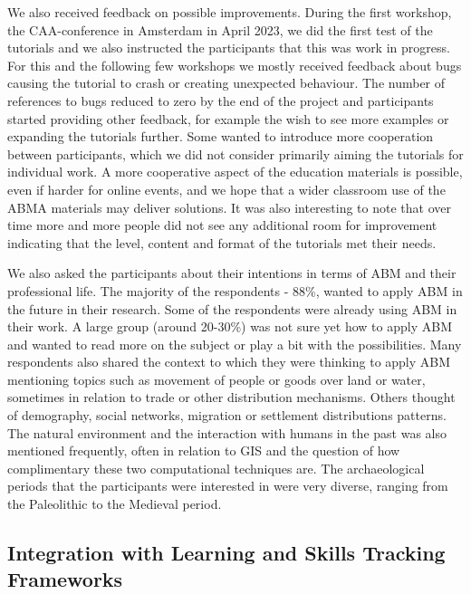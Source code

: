 \documentclass[
]{article}
\begin{document}
We also received feedback on possible improvements. During the first workshop, the CAA-conference in Amsterdam in April 2023, we did the first test of the tutorials and we also instructed the participants that this was work in progress. For this and the following few workshops we mostly received feedback about bugs causing the tutorial to crash or creating unexpected behaviour. The number of references to bugs reduced to zero by the end of the project and participants started providing other feedback, for example the wish to see more examples or expanding the tutorials further. Some wanted to introduce more cooperation between participants, which we did not consider primarily aiming the tutorials for individual work. A more cooperative aspect of the education materials is possible, even if harder for online events, and we hope that a wider classroom use of the ABMA materials may deliver solutions. It was also interesting to note that over time more and more people did not see any additional room for improvement indicating that the level, content and format of the tutorials met their needs.

We also asked the participants about their intentions in terms of ABM and their professional life. The majority of the respondents - 88\%, wanted to apply ABM in the future in their research. Some of the respondents were already using ABM in their work. A large group (around 20-30\%) was not sure yet how to apply ABM and wanted to read more on the subject or play a bit with the possibilities. Many respondents also shared the context to which they were thinking to apply ABM mentioning topics such as movement of people or goods over land or water, sometimes in relation to trade or other distribution mechanisms. Others thought of demography, social networks, migration or settlement distributions patterns. The natural environment and the interaction with humans in the past was also mentioned frequently, often in relation to GIS and the question of how complimentary these two computational techniques are. The archaeological periods that the participants were interested in were very diverse, ranging from the Paleolithic to the Medieval period.

\hypertarget{integration-with-learning-and-skills-tracking-frameworks}{%
\subsection{Integration with Learning and Skills Tracking Frameworks}\label{integration-with-learning-and-skills-tracking-frameworks}}
\end{document}
